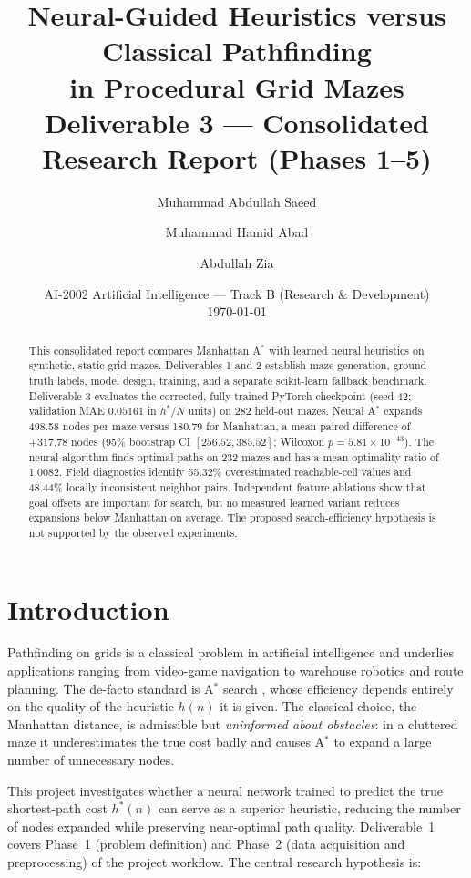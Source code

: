 \documentclass[11pt]{article}
\title{\textbf{Neural-Guided Heuristics versus Classical Pathfinding\\ in Procedural Grid Mazes}\\[4pt]
\large Deliverable 3 --- Consolidated Research Report (Phases 1--5)}
\author{
  Muhammad Abdullah Saeed \and
  Muhammad Hamid Abad \and
  Abdullah Zia
}
\date{AI-2002 Artificial Intelligence --- Track B (Research \& Development)\\ \today}
\begin{document}
\maketitle

\begin{abstract}
This consolidated report compares Manhattan A$^\ast$ with learned neural
heuristics on synthetic, static grid mazes. Deliverables 1 and 2 establish
maze generation, ground-truth labels, model design, training, and a separate
scikit-learn fallback benchmark. Deliverable 3 evaluates the corrected,
fully trained PyTorch checkpoint (seed 42; validation MAE $0.05161$ in
$h^\ast/N$ units) on 282 held-out mazes. Neural A$^\ast$ expands
498.58 nodes per maze versus 180.79 for Manhattan, a mean paired difference
of $+317.78$ nodes (95\% bootstrap CI $[256.52,385.52]$; Wilcoxon
$p=5.81\times10^{-43}$). The neural algorithm finds optimal paths on 232
mazes and has a mean optimality ratio of 1.0082. Field diagnostics identify
55.32\% overestimated reachable-cell values and 48.44\% locally inconsistent
neighbor pairs. Independent feature ablations show that goal offsets are
important for search, but no measured learned variant reduces expansions
below Manhattan on average. The proposed search-efficiency hypothesis is
not supported by the observed experiments.
\end{abstract}

\section{Introduction}
Pathfinding on grids is a classical problem in artificial intelligence and underlies
applications ranging from video-game navigation to warehouse robotics and route
planning. The de-facto standard is A$^\ast$ search \cite{hart1968}, whose efficiency
depends entirely on the quality of the heuristic $h(n)$ it is given. The classical
choice, the Manhattan distance, is admissible but \emph{uninformed about obstacles}:
in a cluttered maze it underestimates the true cost badly and causes A$^\ast$ to expand
a large number of unnecessary nodes.

This project investigates whether a neural network trained to predict the true
shortest-path cost $h^\ast(n)$ can serve as a superior heuristic, reducing the number of
nodes expanded while preserving near-optimal path quality. Deliverable~1 covers
Phase~1 (problem definition) and Phase~2 (data acquisition and preprocessing) of the
project workflow. The central research hypothesis is:
\end{document}
